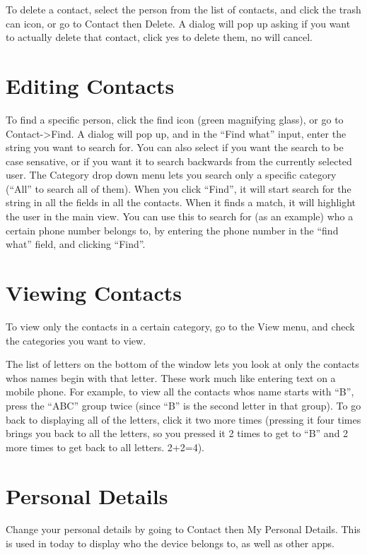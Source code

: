 \documentclass[12pt,letterpaper,oneside, openany]{book} \usepackage[latin1] {inputenc}
\begin{document}
To delete a contact, select the person from the list of contacts, and click the trash can icon, or go to Contact then Delete. A dialog will pop up asking if you want to actually delete that contact, click yes to delete them, no will cancel. 

\section{Editing Contacts}

To find a specific person, click the find icon (green magnifying glass), or go to Contact->Find. A dialog will pop up, and in the ``Find what'' input, enter the string you want to search for. You can also select if you want the search to be case sensative, or if you want it to search backwards from the currently selected user. The Category drop down menu lets you search only a specific category (``All'' to search all of them). When you click ``Find'', it will start search for the string in all the fields in all the contacts. When it finds a match, it will highlight the user in the main view. You can use this to search for (as an example) who a certain phone number belongs to, by entering the phone number in the ``find what'' field, and clicking ``Find''. 


\section{Viewing Contacts}

To view only the contacts in a certain category, go to the View menu, and check the categories you want to view. 

The list of letters on the bottom of the window lets you look at only the contacts whos names begin with that letter. These work much like entering text on a mobile phone. For example, to view all the contacts whos name starts with ``B'', press the ``ABC'' group twice (since ``B'' is the second letter in that group). To go back to displaying all of the letters, click it two more times (pressing it four times brings you back to all the letters, so you pressed it 2 times to get to ``B'' and 2 more times to get back to all letters. 2+2=4). 


\section{Personal Details}

Change your personal details by going to Contact then My Personal Details. This is used in today to display who the device belongs to, as well as other apps.
\end{document}
